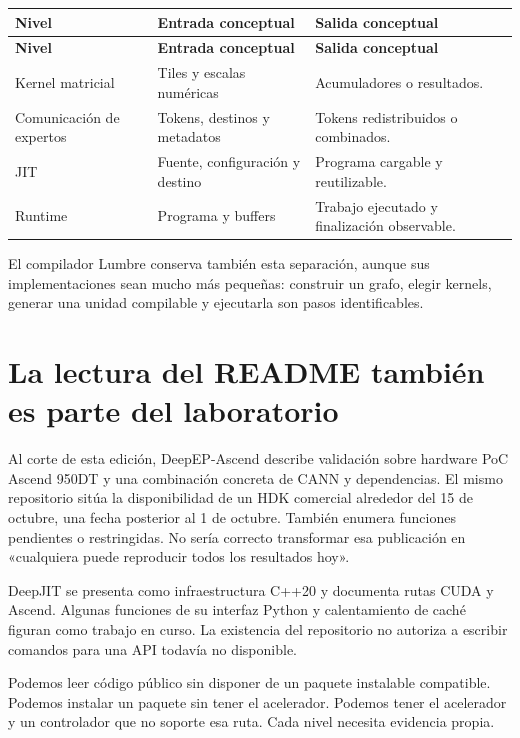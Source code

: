 \documentclass[12pt,a4paper,oneside]{report}
\begin{document}
{\small
\begin{longtable}{@{}P{0.28\textwidth}P{0.32\textwidth}P{0.34\textwidth}@{}}
\toprule
\textbf{Nivel} & \textbf{Entrada conceptual} & \textbf{Salida conceptual}\\
\midrule
\endfirsthead
\toprule
\textbf{Nivel} & \textbf{Entrada conceptual} & \textbf{Salida conceptual}\\
\midrule
\endhead
Kernel matricial & Tiles y escalas numéricas & Acumuladores o resultados.\\
Comunicación de expertos & Tokens, destinos y metadatos & Tokens redistribuidos o combinados.\\
JIT & Fuente, configuración y destino & Programa cargable y reutilizable.\\
Runtime & Programa y buffers & Trabajo ejecutado y finalización observable.\\
\bottomrule
\end{longtable}
}
El compilador Lumbre conserva también esta separación, aunque sus implementaciones sean mucho más pequeñas: construir un grafo, elegir kernels, generar una unidad compilable y ejecutarla son pasos identificables.

\section{La lectura del README también es parte del laboratorio}
Al corte de esta edición, DeepEP-Ascend describe validación sobre hardware PoC Ascend 950DT y una combinación concreta de CANN y dependencias. El mismo repositorio sitúa la disponibilidad de un HDK comercial alrededor del 15 de octubre, una fecha posterior al 1 de octubre. También enumera funciones pendientes o restringidas. No sería correcto transformar esa publicación en «cualquiera puede reproducir todos los resultados hoy». \cite{deepep-ascend}

DeepJIT se presenta como infraestructura C++20 y documenta rutas CUDA y Ascend. Algunas funciones de su interfaz Python y calentamiento de caché figuran como trabajo en curso. La existencia del repositorio no autoriza a escribir comandos para una API todavía no disponible. \cite{deepjit}

\begin{cuidado}
Podemos leer código público sin disponer de un paquete instalable compatible. Podemos instalar un paquete sin tener el acelerador. Podemos tener el acelerador y un controlador que no soporte esa ruta. Cada nivel necesita evidencia propia.

\end{cuidado}
\end{document}
